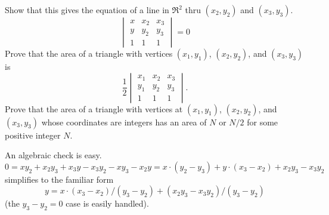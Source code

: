 \begin{exercises}
  \recommended \item
    \begin{exparts}
      \partsitem Show that this gives 
        the equation of a line in \( \Re^2 \) thru
        \( (x_2,y_2) \) and \( (x_3,y_3) \).
        \begin{equation*}
          \begin{vmatrix}
            x    &x_2 &x_3  \\
            y    &y_2 &y_3  \\
            1    &1   &1
          \end{vmatrix}=0
        \end{equation*}
      \partsitem \cite{Monthly55p249}
        Prove that the area of a triangle with vertices \( (x_1,y_1) \),
        \( (x_2,y_2) \), and \( (x_3,y_3) \) is
        \begin{equation*}
          \frac{1}{2}
          \begin{vmatrix}
            x_1  &x_2 &x_3  \\
            y_1  &y_2 &y_3  \\
            1    &1   &1
          \end{vmatrix}.
        \end{equation*}
      \partsitem \cite{MathMag73p286}
        Prove that the area of a triangle with vertices at \( (x_1,y_1) \),
        \( (x_2,y_2) \), and \( (x_3,y_3) \) whose coordinates are integers
        has an area of \( N \) or \( N/2 \) for some positive integer \( N \).
    \end{exparts}
    \begin{answer}
      \begin{exparts}
        \partsitem An algebraic check is easy.
        \begin{equation*}
          0
          =xy_2+x_2y_3+x_3y-x_3y_2-xy_3-x_2y 
          =x\cdot (y_2-y_3)+y\cdot (x_3-x_2)+x_2y_3-x_3y_2 
        \end{equation*}
        simplifies to the familiar form
        \begin{equation*}
          y=x\cdot (x_3-x_2)/(y_3-y_2)+(x_2y_3-x_3y_2)/(y_3-y_2)
        \end{equation*}
        (the $y_3-y_2=0$ case is easily handled).


\end{exparts}
\end{answer}
\end{exercises}
